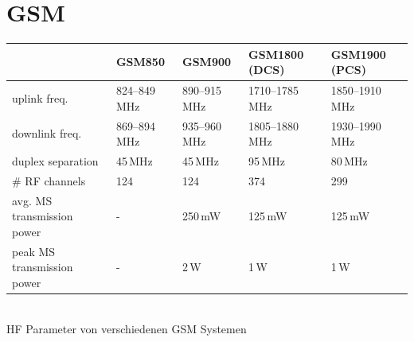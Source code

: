 \section{GSM}
\label{sec:gsm}
	\begin{center}
	\begin{tabular}{|l|l|l|l|l|} \hline
	          & GSM850     & GSM900        & GSM1800 (DCS)       & GSM1900 (PCS) \\ \hline  \hline
	uplink freq.
	   &  824--849\,MHz & 890--915\,MHz & 1710--1785\,MHz & 1850--1910\,MHz \\ \hline
	downlink freq. 
	   & 869–894\,MHz  & 935--960\,MHz & 1805--1880\,MHz & 1930--1990\,MHz \\ \hline
	duplex separation 
	   &  45\,MHz & 45\,MHz & 95\,MHz & 80\,MHz \\ \hline
	\# RF channels 
	   & 124  & 124 & 374 & 299 \\ \hline
	avg. MS transmission power 
	   & - & 250\,mW & 125\,mW & 125\,mW \\ \hline
	peak MS transmission power 
	   & -  & 2\,W & 1\,W & 1\,W \\ \hline
	\end{tabular} \\
	HF Parameter von verschiedenen GSM Systemen
	\end{center}

